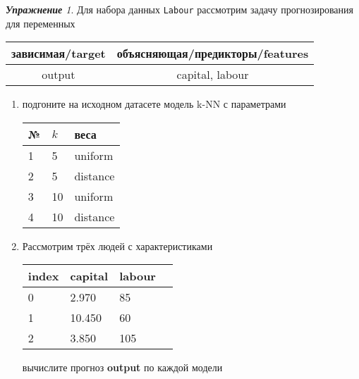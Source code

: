 \documentclass[a4,12pt]{article}
\theoremstyle{remark}
\newtheorem{exercise}{\textbf{Упражнение}}[section]
\begin{document}
\begin{exercise}
Для набора данных \texttt{Labour} рассмотрим задачу прогнозирования
для переменных
\begin{center}
	\begin{tabular}{|c|c|}\hline
		зависимая/target & объясняющая/предикторы/features \\ \hline
		output & capital, labour \\ \hline
	\end{tabular}
\end{center}
\begin{enumerate}
	\item подгоните на исходном датасете модель k-NN с параметрами
	\begin{center}
		\begin{tabular}{|l|l|l|}\hline
		№ & \(k\) & веса \\ \hline
		1 & 5 & uniform \\
		2 & 5 & distance \\
		3 & 10 & uniform \\
		4 & 10 & distance \\ \hline
		\end{tabular}
	\end{center}
	\item Рассмотрим трёх людей с характеристиками
	\begin{center}
		\begin{tabular}{|l||l||l|l|}\hline
			index & capital & labour \\ \hline\hline
			0 & 2.970 & 85 \\
			1 & 10.450 & 60  \\
			2 & 3.850 & 105 \\ \hline
		\end{tabular}
	\end{center}
	вычислите прогноз \textbf{output} по каждой модели
\end{enumerate}
\end{exercise}
\end{document}
